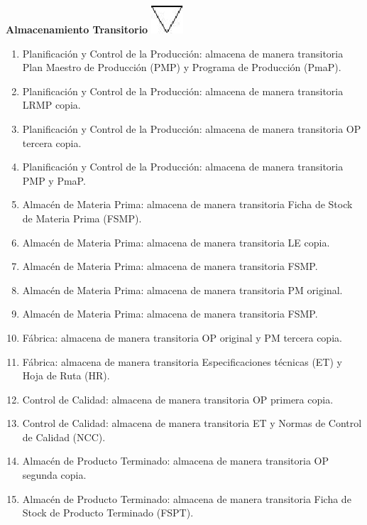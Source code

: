 \begin{center}
  \textbf{Almacenamiento Transitorio}
  \includegraphics{./Images/Simbolos/simbolo-Almacenamiento-Transitorio.png}
\end{center}
\begin{enumerate}
  \item Planificaci\'on y Control de la Producci\'on: almacena de manera transitoria Plan Maestro de Producci\'on (PMP) y Programa de Producci\'on (PmaP).
  \item Planificaci\'on y Control de la Producci\'on: almacena de manera transitoria LRMP copia.
  \item Planificaci\'on y Control de la Producci\'on: almacena de manera transitoria OP tercera copia.
  \item Planificaci\'on y Control de la Producci\'on: almacena de manera transitoria PMP y PmaP.
  \item Almac\'en de Materia Prima: almacena de manera transitoria Ficha de Stock de Materia Prima (FSMP).
  \item Almac\'en de Materia Prima: almacena de manera transitoria LE copia.
  \item Almac\'en de Materia Prima: almacena de manera transitoria FSMP.
  \item Almac\'en de Materia Prima: almacena de manera transitoria PM original.  
  \item Almac\'en de Materia Prima: almacena de manera transitoria FSMP.
  \item F\'abrica: almacena de manera transitoria OP original y PM tercera copia.
  \item F\'abrica: almacena de manera transitoria Especificaciones t\'ecnicas (ET) y Hoja de Ruta (HR).
  \item Control de Calidad: almacena de manera transitoria OP primera copia.
  \item Control de Calidad: almacena de manera transitoria ET y Normas de Control de Calidad (NCC).
  \item Almac\'en de Producto Terminado: almacena de manera transitoria OP segunda copia.
  \item Almac\'en de Producto Terminado: almacena de manera transitoria Ficha de Stock de Producto Terminado (FSPT).
\end{enumerate}

